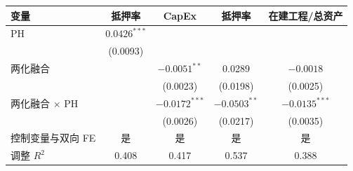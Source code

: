 {\scriptsize
\begin{center}
\begin{tabular}{lcccc}
  \toprule
  变量 & 抵押率 & CapEx & 抵押率 & 在建工程/总资产 \\
  \midrule
  PH & $0.0426^{***}$ &  &  &  \\
     & (0.0093) &  &  &  \\
  两化融合 &  & $-0.0051^{**}$ & 0.0289 & $-0.0018$ \\
           &  & (0.0023) & (0.0198) & (0.0025) \\
  两化融合 $\times$ PH &  & $-0.0172^{***}$ & $-0.0503^{**}$ & $-0.0135^{***}$ \\
                       &  & (0.0026) & (0.0217) & (0.0035) \\
  控制变量与双向 FE & 是 & 是 & 是 & 是 \\
  调整 $R^2$ & 0.408 & 0.417 & 0.537 & 0.388 \\
  \bottomrule
\end{tabular}
\end{center}
}
